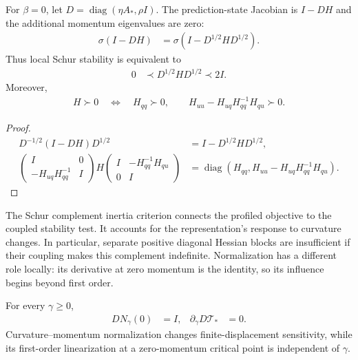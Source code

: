 \begin{proposition}
For $\beta=0$, let $D=\operatorname{diag}(\eta A_*,\rho I)$. The prediction-state Jacobian is $I-DH$ and the additional momentum eigenvalues are zero:
\begin{align}
 \sigma(I-DH)&=\sigma(I-D^{1/2}HD^{1/2}).
\end{align}
Thus local Schur stability is equivalent to
\begin{align}
 0&\prec D^{1/2}HD^{1/2}\prec2I.
\end{align}
Moreover,
\begin{align}
 H\succ0\quad\Longleftrightarrow\quad
 H_{qq}\succ0,\qquad H_{uu}-H_{uq}H_{qq}^{-1}H_{qu}\succ0.
\end{align}
\end{proposition}
\begin{proof}
\begin{align}
 D^{-1/2}(I-DH)D^{1/2}&=I-D^{1/2}HD^{1/2},\\
 \begin{pmatrix}I&0\\-H_{uq}H_{qq}^{-1}&I\end{pmatrix}
 H
 \begin{pmatrix}I&-H_{qq}^{-1}H_{qu}\\0&I\end{pmatrix}
 &=\operatorname{diag}(H_{qq},H_{uu}-H_{uq}H_{qq}^{-1}H_{qu}).
\end{align}
\end{proof}

The Schur complement inertia criterion \citep{horn2013matrix} connects the profiled objective to the coupled stability test. It accounts for the representation's response to curvature changes. In particular, separate positive diagonal Hessian blocks are insufficient if their coupling makes this complement indefinite. Normalization has a different role locally: its derivative at zero momentum is the identity, so its influence begins beyond first order.

\begin{corollary}
For every $\gamma\ge0$,
\begin{align}
 DN_\gamma(0)&=I,&\partial_\gamma D\mathcal T_*&=0.
\end{align}
Curvature--momentum normalization changes finite-displacement sensitivity, while its first-order linearization at a zero-momentum critical point is independent of $\gamma$.
\end{corollary}


